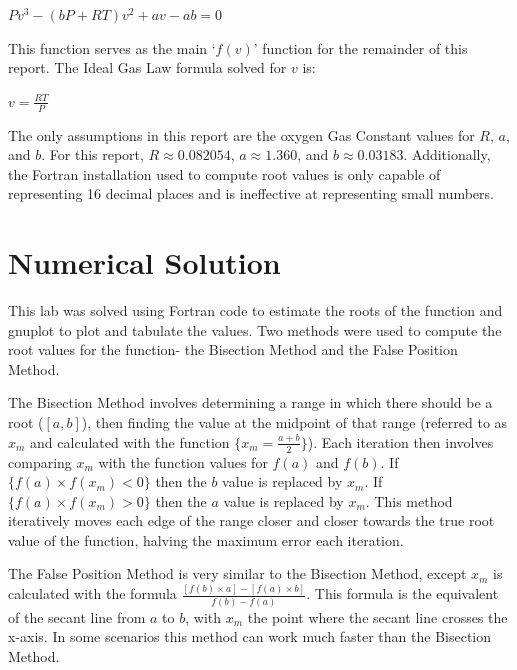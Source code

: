 \documentclass[12pt, letterpaper]{article}
\begin{document}
		\begin{center}
			$Pv^3-(bP+RT)v^2+av-ab=0$
		\end{center}
	
	This function serves as the main `$f(v)$' function for the remainder of this report. The Ideal Gas Law formula solved for $v$ is:

		\begin{center}
			$v=\frac{RT}{P}$
		\end{center}

	The only assumptions in this report are the oxygen Gas Constant values for $R$, $a$, and $b$. For this report, $R\approx0.082054$, $a\approx1.360$, and $b\approx0.03183$. Additionally, the Fortran installation used to compute root values is only capable of representing 16 decimal places and is ineffective at representing small numbers.

\section{Numerical Solution}
	This lab was solved using Fortran code to estimate the roots of the function and gnuplot to plot and tabulate the values. Two methods were used to compute the root values for the function- the Bisection Method and the False Position Method.

	The Bisection Method involves determining a range in which there should be a root ($[a,b]$), then finding the value at the midpoint of that range (referred to as $x_m$ and calculated with the function $\{x_m=\frac{a+b}{2}\}$). Each iteration then involves comparing $x_m$ with the function values for $f(a)$ and $f(b)$. If $\{f(a)\times f(x_m)<0\}$ then the $b$ value is replaced by $x_m$. If $\{f(a)\times f(x_m)>0\}$ then the $a$ value is replaced by $x_m$. This method iteratively moves each edge of the range closer and closer towards the true root value of the function, halving the maximum error each iteration.

	The False Position Method is very similar to the Bisection Method, except $x_m$ is calculated with the formula $\frac{[f(b)\times a]-[f(a)\times b]}{f(b)-f(a)}$. This formula is the equivalent of the secant line from $a$ to $b$, with $x_m$ the point where the secant line crosses the x-axis. In some scenarios this method can work much faster than the Bisection Method.

\end{document}
